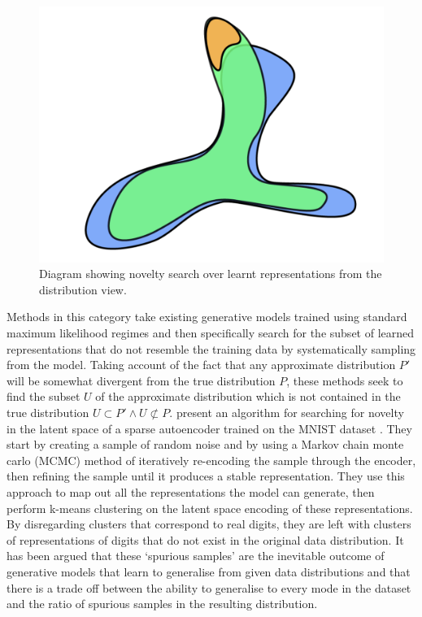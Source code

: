 \begin{figure}[!htbp]
    \centering
    \includegraphics[width=1\textwidth]{figures/c6_active_div/diagrams/novelty_search.png}
    \caption[Novelty search over learned representations]{Diagram showing novelty search over learnt representations from the distribution view.}
  \label{fig:c6:novelty-search}
  \end{figure}

Methods in this category take existing generative models trained using standard maximum likelihood regimes and then specifically search for the subset of learned representations that do not resemble the training data by systematically sampling from the model. 
Taking account of the fact that any approximate distribution $P'$ will be somewhat divergent from the true distribution $P$, these methods seek to find the subset $U$ of the approximate distribution which is not contained in the true distribution $U \subset P' \wedge U \not\subset P$. \citet{kazakcci2016digits} present an algorithm for searching for novelty in the latent space of a sparse autoencoder trained on the MNIST dataset \citep{lecun1998gradient}. 
They start by creating a sample of random noise and by using a Markov chain monte carlo (MCMC) method of iteratively re-encoding the sample through the encoder, then refining the sample until it produces a stable representation. 
They use this approach to map out all the representations the model can generate, then perform k-means clustering on the latent space encoding of these representations. 
By disregarding clusters that correspond to real digits, they are left with clusters of representations of digits that do not exist in the original data distribution. 
It has been argued that these `spurious samples' are the inevitable outcome of generative models that learn to generalise from given data distributions \citep{kegl2018spurious} and that there is a trade off between the ability to generalise to every mode in the dataset and the ratio of spurious samples in the resulting distribution. 

